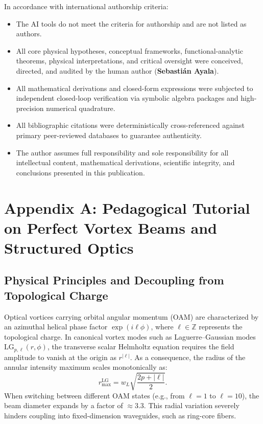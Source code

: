 \documentclass[11pt,a4paper]{article}
\begin{document}
In accordance with international authorship criteria:
\begin{itemize}
    \item The AI tools do not meet the criteria for authorship and are not listed as authors.
    \item All core physical hypotheses, conceptual frameworks, functional-analytic theorems, physical interpretations, and critical oversight were conceived, directed, and audited by the human author (\textbf{Sebastián Ayala}).
    \item All mathematical derivations and closed-form expressions were subjected to independent closed-loop verification via symbolic algebra packages and high-precision numerical quadrature.
    \item All bibliographic citations were deterministically cross-referenced against primary peer-reviewed databases to guarantee authenticity.
    \item The author assumes full responsibility and sole responsibility for all intellectual content, mathematical derivations, scientific integrity, and conclusions presented in this publication.
\end{itemize}

\appendix

\section{Appendix A: Pedagogical Tutorial on Perfect Vortex Beams and Structured Optics}
\label{app:primer}

\subsection{Physical Principles and Decoupling from Topological Charge}

Optical vortices carrying orbital angular momentum (OAM) are characterized by an azimuthal helical phase factor $\exp(i \ell \phi)$, where $\ell \in \mathbb{Z}$ represents the topological charge. In canonical vortex modes such as Laguerre--Gaussian modes $\text{LG}_{p, \ell}(r, \phi)$, the transverse scalar Helmholtz equation requires the field amplitude to vanish at the origin as $r^{|\ell|}$. As a consequence, the radius of the annular intensity maximum scales monotonically as:
\begin{equation}
r_{\max}^{\text{LG}} = w_L \sqrt{\frac{2p + |\ell|}{2}}.
\label{eq:app_lg_scaling}
\end{equation}
When switching between different OAM states (e.g., from $\ell=1$ to $\ell=10$), the beam diameter expands by a factor of $\approx 3.3$. This radial variation severely hinders coupling into fixed-dimension waveguides, such as ring-core fibers.
\end{document}
